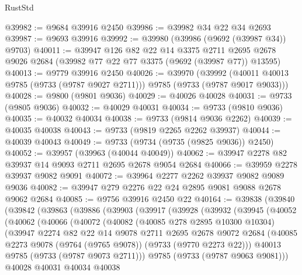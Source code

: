 \begin{lexlean}{RustStd}
\begin{coremodule}
{\begin{coremodule}
{{{{{{{{{{{{{{{{{{{{{{{{{{{{{{{{{{{{{{{{{{{{{{{{{{{{{{{@39982 := @9684 @39916 @2450
@39986 := @39982 @34 @22 @34 @2693
@39987 := @9693 @39916
@39992 := @39980 (@39986 (@9692 (@39987 @34)) @9703)
@40011 := @39947
    @126
    @82
    @22
    @14
    @3375
    @2711
    @2695
    @2678
    @9026
    @2684
    (@39982 @77 @22 @77 @3375 (@9692 (@39987 @77)) @13595)
@40013 := @9779 @39916 @2450
@40026 := @39970
    (@39992 (@40011 @40013 @9785 (@9733 (@9787 @9027 @2711))) @9785 (@9733 (@9787 @9017 @9033)))
@40028 := @9800 (@9801 @9036)
@40029 := @40026 @40028
@40031 := @9733 (@9805 @9036)
@40032 := @40029 @40031
@40034 := @9733 (@9810 @9036)
@40035 := @40032 @40034
@40038 := @9733 (@9814 @9036 @2262)
@40039 := @40035 @40038
@40043 := @9733 (@9819 @2265 @2262 @39937)
@40044 := @40039 @40043
@40049 := @9733 (@9734 (@9735 (@9825 @9036)) @2450)
@40052 := @39957 (@39963 (@40044 @40049))
@40062 := @39947 @2278 @82 @39937 @14 @9093 @2711 @2695 @2678 @9054 @2684
@40066 := @39959 @2278 @39937 @9082 @9091
@40072 := @39964 @2277 @2262 @39937 @9082 @9089 @9036
@40082 := @39947 @279 @2276 @22 @24 @2895 @9081 @9088 @2678 @9062 @2684
@40085 := @9756 @39916 @2450 @22
@40164 := @39838
    (@39840
      (@39842
        (@39863
          (@39886
            (@39903
              (@39917
                (@39928
                  (@39932
                    (@39945
                      (@40052
                        (@40062
                          (@40066
                            (@40072
                              (@40082
                                (@40085 @278 @2895 @10300 @10304)
                                (@39947
                                  @2274
                                  @82
                                  @22
                                  @14
                                  @9078
                                  @2711
                                  @2695
                                  @2678
                                  @9072
                                  @2684
                                  (@40085
                                    @2273
                                    @9078
                                    (@9764 (@9765 @9078))
                                    (@9733 (@9770 @2273 @22)))
                                  @40013
                                  @9785
                                  (@9733 (@9787 @9073 @2711)))
                                @9785
                                (@9733 (@9787 @9063 @9081)))
                              @40028
                              @40031
                              @40034
                              @40038
}}}}}}}}}}}}}}}}}}}}}}}}}}}}}}}}}}}}}}}}}}}}}}}}}}}}}}}
\end{coremodule}}
\end{coremodule}
\end{lexlean}
